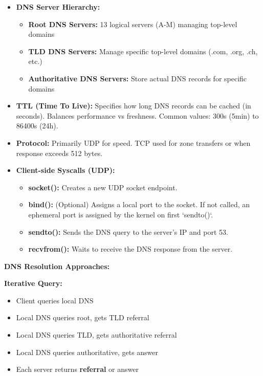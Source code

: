 \begin{minipage}[htp]{0.5\textwidth}
\begin{itemize}[noitemsep,nolistsep,topsep=0px,partopsep=0pt,parsep=0pt]
        \item[-] \textbf{DNS Server Hierarchy:}
        \begin{itemize}[noitemsep,nolistsep,topsep=-5px,partopsep=0pt,parsep=0pt]
            \item \textbf{Root DNS Servers:} 13 logical servers (A-M) managing top-level domains
            \item \textbf{TLD DNS Servers:} Manage specific top-level domains (.com, .org, .ch, etc.)
            \item \textbf{Authoritative DNS Servers:} Store actual DNS records for specific domains
        \end{itemize}
        \item[-] \textbf{TTL (Time To Live):} Specifies how long DNS records can be cached (in seconds). Balances performance vs freshness. Common values: 300s (5min) to 86400s (24h).
        \item[-] \textbf{Protocol:} Primarily UDP for speed. TCP used for zone transfers or when response exceeds 512 bytes.
        \item[-] \textbf{Client-side Syscalls (UDP):}
        \begin{itemize}[noitemsep,nolistsep,topsep=0px,partopsep=0pt,parsep=0pt]
            \item \textbf{socket():} Creates a new UDP socket endpoint.
            \item \textbf{bind():} (Optional) Assigns a local port to the socket. If not called, an ephemeral port is assigned by the kernel on first `sendto()`.
            \item \textbf{sendto():} Sends the DNS query to the server's IP and port 53.
            \item \textbf{recvfrom():} Waits to receive the DNS response from the server.
        \end{itemize}
    \end{itemize}
    \noindent\textbf{DNS Resolution Approaches:}\\
    \begin{minipage}[htp]{0.48\textwidth}
        \textbf{Iterative Query:}
        \begin{itemize}[noitemsep,nolistsep,topsep=0px,partopsep=0pt,parsep=0pt]
            \item Client queries local DNS
            \item Local DNS queries root, gets TLD referral
            \item Local DNS queries TLD, gets authoritative referral  
            \item Local DNS queries authoritative, gets answer
            \item Each server returns \textbf{referral} or answer
        \end{itemize}


\end{minipage}
\end{minipage}
